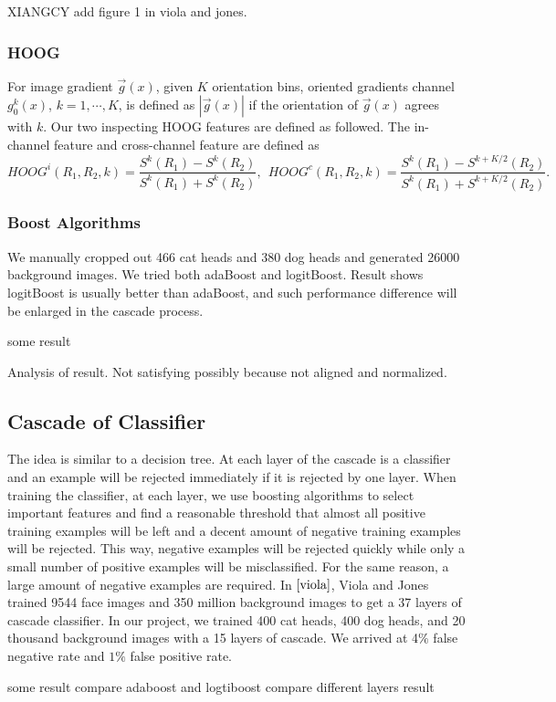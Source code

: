 \documentclass[12pt]{article}
\begin{document}
XIANGCY add figure 1 in viola and jones.

\subsubsection{HOOG}
For image gradient $\vec{g}(x)$, given $K$ orientation bins, oriented gradients channel $g^k_0(x)$, $k = 1, \cdots, K$, is defined as $|\vec{g}(x)|$ if the orientation of $\vec{g}(x)$ agrees with $k$. Our two inspecting HOOG features are defined as followed. The in-channel feature and cross-channel feature are defined as 
\[HOOG^i(R_1,R_2, k) = \frac{S^k(R_1) - S^k(R_2)}{S^k(R_1) + S^k(R_2)}, ~~HOOG^c(R_1,R_2, k) = \frac{S^k(R_1) - S^{k+K/2}(R_2)}{S^k(R_1) + S^{k+K/2}(R_2)}.\]
\subsubsection{Boost Algorithms}
We manually cropped out 466 cat heads and 380 dog heads and generated 26000 background images. We tried both adaBoost and logitBoost. Result shows logitBoost is usually better than adaBoost, and such performance difference will be enlarged in the cascade process.

some result

Analysis of result. Not satisfying possibly because not aligned and normalized.
\subsection{Cascade of Classifier}
The idea is similar to a decision tree. At each layer of the cascade is a classifier and an example will be rejected immediately if it is rejected by one layer. When training the classifier, at each layer, we use boosting algorithms to select important features and find a reasonable threshold that almost all positive training examples will be left and a decent amount of negative training examples will be rejected. This way, negative examples will be rejected quickly while only a small number of positive examples will be misclassified. For the same reason, a large amount of negative examples are required. In $\cite{viola}$, Viola and Jones trained 9544 face images and 350 million background images to get a 37 layers of cascade classifier. In our project, we trained 400 cat heads, 400 dog heads, and 20 thousand background images with a 15 layers of cascade. We arrived at 4$\%$ false negative rate and $1\%$ false positive rate.   

some result compare adaboost and logtiboost compare different layers result
\end{document}
